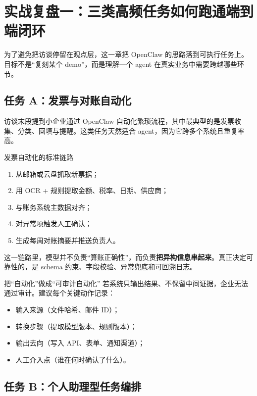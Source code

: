\section{实战复盘一：三类高频任务如何跑通端到端闭环}

为了避免把访谈停留在观点层，这一章把 OpenClaw 的思路落到可执行任务上。目标不是“复刻某个 demo”，而是理解一个 agent 在真实业务中需要跨越哪些环节。

\subsection{任务 A：发票与对账自动化}

访谈末段提到小企业通过 OpenClaw 自动化繁琐流程，其中最典型的是发票收集、分类、回填与提醒。这类任务天然适合 agent，因为它跨多个系统且重复率高。

\begin{knowledgebox}{发票自动化的标准链路}
\begin{enumerate}
    \item 从邮箱或云盘抓取新票据；
    \item 用 OCR + 规则提取金额、税率、日期、供应商；
    \item 与账务系统主数据对齐；
    \item 对异常项触发人工确认；
    \item 生成每周对账摘要并推送负责人。
\end{enumerate}
\end{knowledgebox}

这一链路里，模型并不负责“算账正确性”，而负责\textbf{把异构信息串起来}。真正决定可靠性的，是 schema 约束、字段校验、异常兜底和可回溯日志。

\begin{importantbox}{把“自动化”做成“可审计自动化”}
若系统只输出结果、不保留中间证据，企业无法通过审计。建议每个关键动作记录：
\begin{itemize}
    \item 输入来源（文件哈希、邮件 ID）；
    \item 转换步骤（提取模型版本、规则版本）；
    \item 输出去向（写入 API、表单、通知渠道）；
    \item 人工介入点（谁在何时确认了什么）。
\end{itemize}
\end{importantbox}

\subsection{任务 B：个人助理型任务编排}

